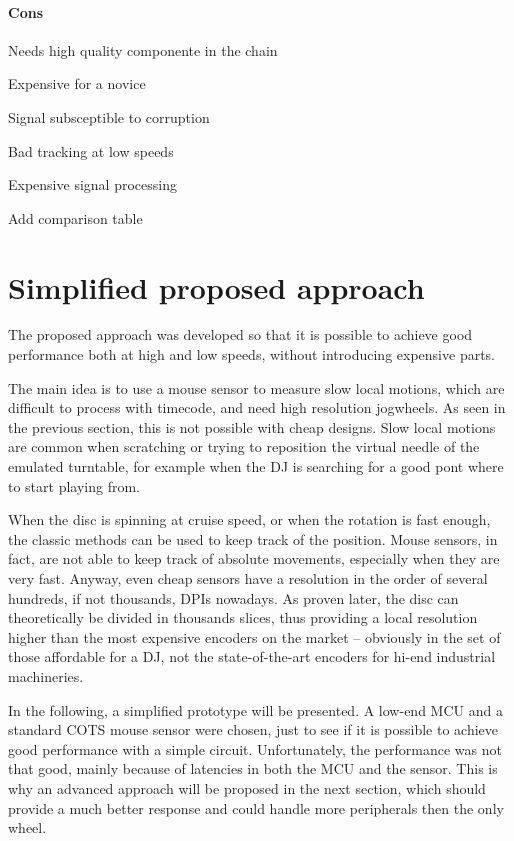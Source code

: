 \documentclass[a4paper,10pt]{article}
\begin{document}
\begin{multicols}{2}
\paragraph{Cons}
\begin{itemize*}
	\item Needs high quality componente in the chain
	\item Expensive for a novice
	\item Signal subsceptible to corruption
	\item Bad tracking at low speeds
	\item Expensive signal processing
\end{itemize*}



\TODO Add comparison table


\section{Simplified proposed approach}

The proposed approach was developed so that it is possible to achieve good
performance both at high and low speeds, without introducing expensive parts.

The main idea is to use a mouse sensor to measure slow local motions, which
are difficult to process with timecode, and need high resolution jogwheels.
As seen in the previous section, this is not possible with cheap designs.
Slow local motions are common when scratching or trying to reposition the
virtual needle of the emulated turntable, for example when the DJ is searching
for a good pont where to start playing from.

When the disc is spinning at cruise speed, or when the rotation is fast
enough, the classic methods can be used to keep track of the position.
Mouse sensors, in fact, are not able to keep track of absolute movements,
especially when they are very fast. Anyway, even cheap sensors have a
resolution in the order of several hundreds, if not thousands, DPIs nowadays.
As proven later, the disc can theoretically be divided in thousands slices,
thus providing a local resolution higher than the most expensive encoders on
the market -- obviously in the set of those affordable for a DJ, not the
state-of-the-art encoders for hi-end industrial machineries.

In the following, a simplified prototype will be presented. A low-end MCU and
a standard COTS mouse sensor were chosen, just to see if it is possible to
achieve good performance with a simple circuit. Unfortunately, the performance
was not that good, mainly because of latencies in both the MCU and the sensor.
This is why an advanced approach will be proposed in the next section, which
should provide a much better response and could handle more peripherals then
the only wheel.



\end{multicols}
\end{document}
